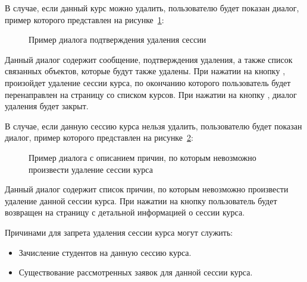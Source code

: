 В случае, если данный курс можно удалить, пользователю будет показан диалог, пример которого представлен на рисунке~\ref{img:course_session:session_success_delete_message}:
\begin{figure}[H]
	\caption{Пример диалога подтверждения удаления сессии}
	\label{img:course_session:session_success_delete_message}
\end{figure}
Данный диалог содержит сообщение, подтверждения удаления, а также список связанных объектов, которые будут также удалены.
При нажатии на кнопку , произойдет удаление сессии курса, по окончанию которого пользователь будет перенаправлен на страницу со списком курсов.
При нажатии на кнопку , диалог удаления будет закрыт.

В случае, если данную сессию курса нельзя удалить, пользователю будет показан диалог, пример которого представлен на рисунке~\ref{img:course_session:session_fail_delete_message}:
\begin{figure}[H]
	\caption{Пример диалога с описанием причин, по которым невозможно произвести удаление сессии курса}
	\label{img:course_session:session_fail_delete_message}
\end{figure}
Данный диалог содержит список причин, по которым невозможно произвести удаление данной сессии курса.
При нажатии на кнопку  пользователь будет возвращен на страницу с детальной информацией о сессии курса.

Причинами для запрета удаления сессии курса могут служить:
\begin{itemize}
	\item Зачисление студентов на данную сессию курса.
	\item Существование рассмотренных заявок для данной сессии курса.
\end{itemize}

